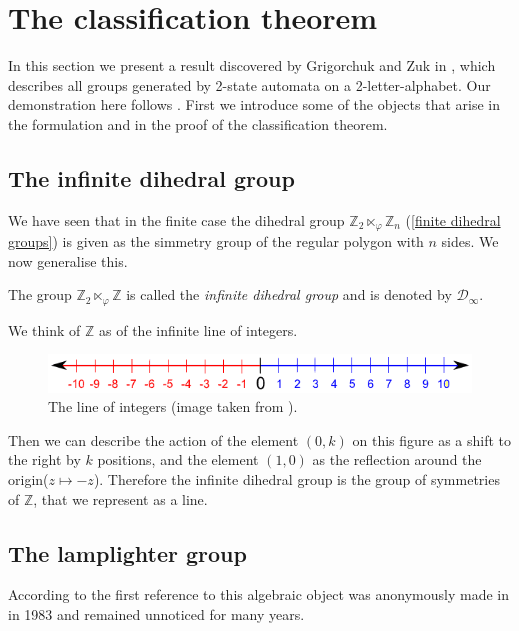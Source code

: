 \documentclass[mat1]{fmfdeloTS2.0}
\newcommand{\Z}{\mathbb Z}
\newcommand{\obs}{}				%
\begin{document}
\smallskip

\section{The classification theorem}
In this section we present a result discovered by Grigorchuk and Zuk in \cite{7}, which describes all groups generated by 2-state automata on a 2-letter-alphabet. Our demonstration here follows \cite{5}. First we introduce some of the objects that arise in the formulation and in the proof of the classification theorem.

\subsection{The infinite dihedral group}

We have seen that in the \obs{finite} case the dihedral group $\Z_2\ltimes_{\varphi}\Z_n$ (\autoref{finite dihedral groups}) is given as the simmetry group of the regular polygon with $n$ sides. We now generalise this.

\begin{definition}
The group $\Z_2\ltimes_{\varphi}\Z$ is called the \emph{infinite dihedral group} and is denoted by $\mathcal{D}_\infty$.
\end{definition}

We think of $\Z$ as of the infinite line of integers.
\begin{figure}[H]

\includegraphics[scale=0.6]{images/integers-numbers-on-number-line.png} 
\caption{The line of integers (image taken from \cite{41}).}
\end{figure}

Then we can describe the action of the element $(0,k)$ on this figure as a shift to the right by $k$ positions, and the element $(1,0)$ as the reflection around the origin($z\longmapsto -z$). Therefore the infinite dihedral group is the group of symmetries of $\Z$, that we represent as a line. 


\subsection{The lamplighter group}
According to \cite{12} the first reference to this algebraic object was anonymously made in \cite{8} in 1983 and remained unnoticed for many years.
\end{document}
